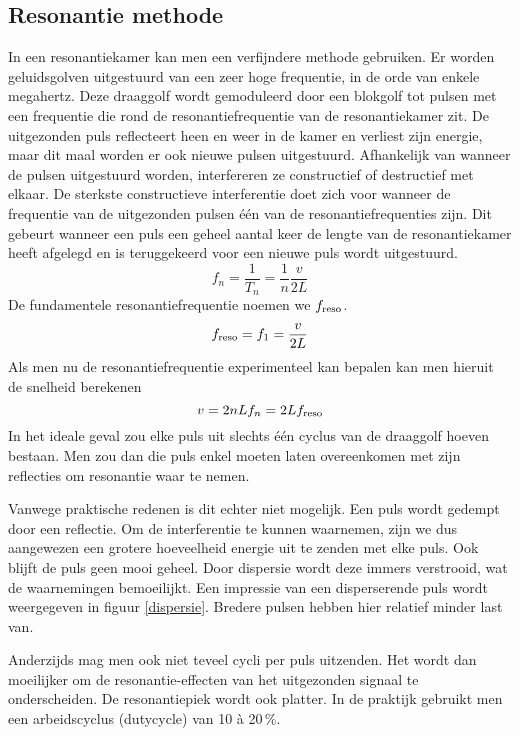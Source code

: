 \subsection{Resonantie methode}

In een resonantiekamer kan men een verfijndere methode gebruiken. Er worden 
geluidsgolven uitgestuurd van een zeer hoge frequentie, in de orde van enkele 
megahertz. Deze draaggolf wordt gemoduleerd door een blokgolf tot pulsen 
met een frequentie die rond de resonantiefrequentie van de resonantiekamer 
zit.  De uitgezonden puls reflecteert heen en weer in de kamer en verliest 
zijn energie, maar dit maal worden er ook nieuwe pulsen uitgestuurd.  
Afhankelijk van wanneer de pulsen uitgestuurd worden, interfereren ze 
constructief of destructief met elkaar. De sterkste constructieve 
interferentie doet zich voor wanneer de frequentie van de uitgezonden 
pulsen \'e\'en van de resonantiefrequenties zijn. Dit gebeurt wanneer een 
puls een geheel aantal keer de lengte van de resonantiekamer heeft afgelegd 
en is teruggekeerd voor een nieuwe puls wordt uitgestuurd.
\begin{equation}
\label{resfreq}
f_n = \frac{1}{T_n} = \frac{1}{n} \frac{v}{2L}
\end{equation}
De fundamentele resonantiefrequentie noemen we $f_\mathrm{reso}$.
$$
f_\mathrm{reso} = f_1 = \frac{v}{2L}
$$
Als men nu de resonantiefrequentie experimenteel kan bepalen kan men hieruit de 
snelheid berekenen
\begin{equation}
\label{v-ifv-f}
v = 2nLf_n = 2L f_\mathrm{reso}
\end{equation}
In het ideale geval zou elke puls uit slechts \'e\'en cyclus van de draaggolf 
hoeven bestaan. Men zou dan die puls enkel moeten laten overeenkomen met 
zijn reflecties om resonantie waar te nemen.

Vanwege praktische redenen is dit echter niet mogelijk. Een puls wordt 
gedempt door een reflectie. Om de interferentie te kunnen waarnemen, zijn 
we dus aangewezen een grotere hoeveelheid energie uit te zenden met elke 
puls. Ook blijft de puls geen mooi geheel. Door dispersie wordt deze immers 
verstrooid, wat de waarnemingen bemoeilijkt. Een impressie van een 
disperserende puls wordt weergegeven in figuur \ref{dispersie}. Bredere 
pulsen hebben hier relatief minder last van.


Anderzijds mag men ook niet teveel cycli per puls uitzenden. Het wordt dan 
moeilijker om de resonantie-effecten van het uitgezonden signaal te 
onderscheiden. De resonantiepiek wordt ook platter. In de praktijk gebruikt men 
een arbeidscyclus (dutycycle) van 10 \`a 20\,\%.

